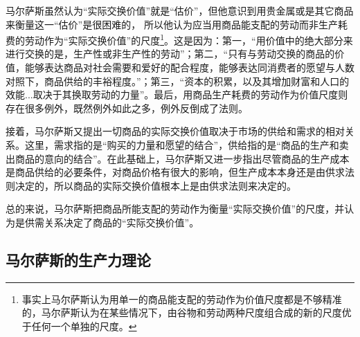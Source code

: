 马尔萨斯虽然认为“实际交换价值”就是“估价”，但他意识到用贵金属或是其它商品来衡量这一“估价”是很困难的\cite[98]{BiLuo*SiLaFaDaWeiLiJiaTuQuanJiDi2JuanMaErSaSiZhengZhiJingJiXueYuanLiPingZhu2013}，
所以他认为应当用商品能支配的劳动而非生产耗费的劳动作为“实际交换价值”的尺度\footnote{事实上马尔萨斯认为用单一的商品能支配的劳动作为价值尺度都是不够精准的，马尔萨斯认为在某些情况下，由谷物和劳动两种尺度组合成的新的尺度优于任何一个单独的尺度\cite[98-105]{BiLuo*SiLaFaDaWeiLiJiaTuQuanJiDi2JuanMaErSaSiZhengZhiJingJiXueYuanLiPingZhu2013}。}\cite[60-82, 92-97]{BiLuo*SiLaFaDaWeiLiJiaTuQuanJiDi2JuanMaErSaSiZhengZhiJingJiXueYuanLiPingZhu2013}\cite[133]{MaErSaSiZhengZhiJingJiXueDingYi2023}。这是因为：第一，“用价值中的绝大部分来进行交换的是，生产性或非生产性的劳动”\cite[92]{BiLuo*SiLaFaDaWeiLiJiaTuQuanJiDi2JuanMaErSaSiZhengZhiJingJiXueYuanLiPingZhu2013}；第二，“只有与劳动交换的商品的价值，能够表达商品对社会需要和爱好的配合程度，能够表达同消费者的愿望与人数对照下，商品供给的丰裕程度。”\cite[92]{BiLuo*SiLaFaDaWeiLiJiaTuQuanJiDi2JuanMaErSaSiZhengZhiJingJiXueYuanLiPingZhu2013}；第三，“资本的积累，以及其增加财富和人口的效能...取决于其换取劳动的力量”\cite[93]{BiLuo*SiLaFaDaWeiLiJiaTuQuanJiDi2JuanMaErSaSiZhengZhiJingJiXueYuanLiPingZhu2013}。最后，用商品生产耗费的劳动作为价值尺度则存在很多例外\cite[60-82]{BiLuo*SiLaFaDaWeiLiJiaTuQuanJiDi2JuanMaErSaSiZhengZhiJingJiXueYuanLiPingZhu2013}，既然例外如此之多，例外反倒成了法则\cite[171]{CaiJiMingCongGuDianZhengZhiJingJiXueDaoZhongGuoTeSeSheHuiZhuYiZhengZhiJingJiXueJiYuZhongGuoShiJiaoDeZhengZhiJingJiXueYanBianShangCe2023}。

接着，马尔萨斯又提出一切商品的实际交换价值取决于市场的供给和需求的相对关系\cite[43]{BiLuo*SiLaFaDaWeiLiJiaTuQuanJiDi2JuanMaErSaSiZhengZhiJingJiXueYuanLiPingZhu2013}。这里，需求指的是“购买的力量和愿望的结合”\cite[43]{BiLuo*SiLaFaDaWeiLiJiaTuQuanJiDi2JuanMaErSaSiZhengZhiJingJiXueYuanLiPingZhu2013}，供给指的是“商品的生产和卖出商品的意向的结合”\cite[43]{BiLuo*SiLaFaDaWeiLiJiaTuQuanJiDi2JuanMaErSaSiZhengZhiJingJiXueYuanLiPingZhu2013}。在此基础上，马尔萨斯又进一步指出尽管商品的生产成本是商品供给的必要条件，对商品价格有很大的影响\cite[50，55]{BiLuo*SiLaFaDaWeiLiJiaTuQuanJiDi2JuanMaErSaSiZhengZhiJingJiXueYuanLiPingZhu2013}，但生产成本本身还是由供求法则决定的，所以商品的实际交换价值根本上是由供求法则来决定的\cite[59]{BiLuo*SiLaFaDaWeiLiJiaTuQuanJiDi2JuanMaErSaSiZhengZhiJingJiXueYuanLiPingZhu2013}。

总的来说，马尔萨斯把商品所能支配的劳动作为衡量“实际交换价值”的尺度，并认为是供需关系决定了商品的“实际交换价值”。

\subsection{马尔萨斯的生产力理论}

